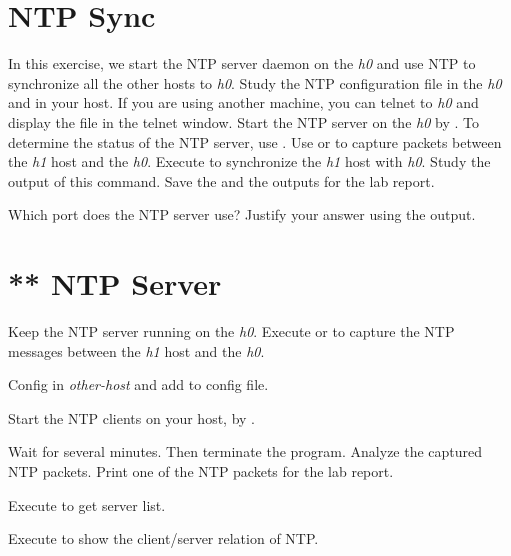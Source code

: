 \documentclass{../UTNetLab}
\begin{document}
\section{NTP Sync}
    In this exercise, we start the NTP server daemon on the \textit{h0} and use NTP to
    synchronize all the other hosts to \textit{h0}.
    Study the NTP configuration file  in the \textit{h0} and in your host.
    If you are using another machine, you can telnet to \textit{h0} and display the  file in the telnet window.
    Start the NTP server on the \textit{h0} by .
    To determine the status of the NTP server, use .
    Use  or  to capture packets between the \textit{h1} host and the \textit{h0}.
    Execute  to synchronize the \textit{h1} host with \textit{h0}.
    Study the output of this command.
    Save the  and the  outputs for the lab report.

    \begin{report}
        \item Which port does the NTP server use?
            Justify your answer using the  output.
    \end{report}

\section{** NTP Server}
    Keep the NTP server running on the \textit{h0}.
    Execute  or  to capture the NTP messages between the \textit{h1} host and the \textit{h0}.

    Config  in \textit{other-host} and add  to config file.

    Start the NTP clients on your host, by .

    Wait for several minutes.
    Then terminate the  program.
    Analyze the captured NTP packets.
    Print one of the NTP packets for the lab report.

    Execute  to get  server list.

    Execute  to show the client/server relation of NTP.
\end{document}
